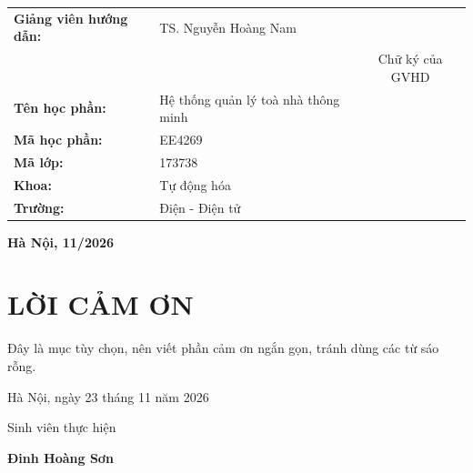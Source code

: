 \documentclass{thesis}
\begin{document}
\begin{table}[H]
  \centering
  \begin{tabular}{l l c}
    \textbf{Giảng viên hướng dẫn:}    &  TS. Nguyễn Hoàng Nam \vspace{6pt} &  \\
    &\vspace{3pt} & \fontsize{10pt}{0pt}\selectfont{} Chữ ký của GVHD \\
    \textbf{Tên học phần:} & Hệ thống quản lý toà nhà thông minh \vspace{3pt}\\
    \textbf{Mã học phần:} & EE4269 \vspace{3pt}\\
    \textbf{Mã lớp:} & 173738 \vspace{3pt}\\
    \textbf{Khoa:} & Tự động hóa \vspace{3pt}\\
    \textbf{Trường:} & Điện - Điện tử
  \end{tabular}
\end{table}

\begin{center}
  \vspace{48pt}
  \fontsize{14pt}{0pt}\selectfont{} \textbf{Hà Nội, 11/2026}
\end{center}

\thispagestyle{empty}
\newpage


\thispagestyle{empty}
\newpage

\section*{LỜI CẢM ƠN}
\thispagestyle{empty}
Đây là mục tùy chọn, nên viết phần cảm ơn ngắn gọn, tránh dùng các từ sáo rỗng.

\vspace{6pt}
\hspace{7cm}Hà Nội, ngày 23 tháng 11 năm 2026

\hspace{8.6cm} Sinh viên thực hiện      %

\vspace{2cm}
\hspace{9.25cm}\textbf{Đinh Hoàng Sơn} %
\end{document}
